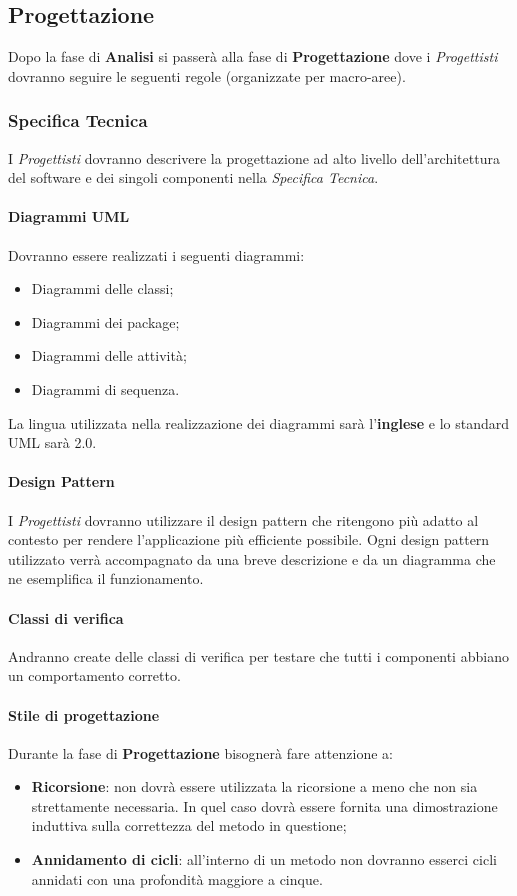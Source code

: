 \subsection{Progettazione}
Dopo la fase di \textbf{Analisi} si passerà alla fase di \textbf{Progettazione} dove i \textit{Progettisti} dovranno seguire le seguenti regole (organizzate per macro-aree).\\
\subsubsection{Specifica Tecnica}
I \textit{Progettisti} dovranno descrivere la progettazione ad alto livello dell'architettura del software e dei singoli componenti nella \textit{Specifica Tecnica}.

\paragraph{Diagrammi UML}
Dovranno essere realizzati i seguenti diagrammi:
\begin{itemize}
	\item Diagrammi delle classi;
	\item Diagrammi dei package;
	\item Diagrammi delle attività;
	\item Diagrammi di sequenza.
\end{itemize}
La lingua utilizzata nella realizzazione dei diagrammi sarà l'\textbf{inglese} e lo standard UML sarà 2.0.

\paragraph{Design Pattern}
I \textit{Progettisti} dovranno utilizzare il design pattern che ritengono più adatto al contesto per rendere l'applicazione più efficiente possibile. Ogni design pattern utilizzato verrà accompagnato da una breve descrizione e da un diagramma che ne esemplifica il funzionamento.

\paragraph{Classi di verifica}
Andranno create delle classi di verifica per testare che tutti i componenti abbiano un comportamento corretto.

\paragraph{Stile di progettazione}
Durante la fase di \textbf{Progettazione} bisognerà fare attenzione a:
\begin{itemize}
	\item \textbf{Ricorsione}: non dovrà essere utilizzata la ricorsione a meno che non sia strettamente necessaria. In quel caso dovrà essere fornita una dimostrazione induttiva sulla correttezza del metodo in questione;
	\item \textbf{Annidamento di cicli}: all'interno di un metodo non dovranno esserci cicli annidati con una profondità maggiore a cinque.
\end{itemize}

